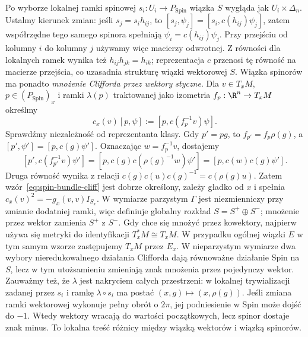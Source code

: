 Po wyborze lokalnej ramki spinowej $s_i:U_i\to P_{\mathrm{Spin}}$
wiązka $S$ wygląda jak $U_i\times\Delta_n$. Ustalmy kierunek
zmian: jeśli $s_j=s_i h_{ij}$, to
$[s_j,\psi_j]=[s_i,c(h_{ij})\psi_j]$, zatem współrzędne
tego samego spinora spełniają $\psi_i=c(h_{ij})\psi_j$.
Przy przejściu od kolumny $i$ do kolumny $j$ używamy więc
macierzy odwrotnej. Z równości dla lokalnych ramek wynika też
$h_{ij}h_{jk}=h_{ik}$; reprezentacja $c$ przenosi tę równość
na macierze przejścia, co uzasadnia strukturę wiązki wektorowej $S$.
Wiązka spinorów ma ponadto \emph{mnożenie Clifforda przez wektory
styczne}. Dla $v\in T_xM$, $p\in(P_{\mathrm{Spin}})_x$ i
ramki $\lambda(p)$ traktowanej jako izometria
$f_p:\R^n\to T_xM$ określmy
\begin{equation}\label{eq:spin-bundle-cliff}
 c_x(v)[p,\psi]
   :=[p,c(f_p^{-1}v)\psi].
\end{equation}
Sprawdźmy niezależność od reprezentanta klasy. Gdy $p'=pg$,
to $f_{p'}=f_p\rho(g)$, a $[p',\psi']=[p,c(g)\psi']$.
Oznaczając $w=f_p^{-1}v$, dostajemy
\[
 [p',c(f_{p'}^{-1}v)\psi']
 =[p,c(g)c(\rho(g)^{-1}w)\psi']
 =[p,c(w)c(g)\psi'].
\]
Druga równość wynika z relacji
$c(g)c(u)c(g)^{-1}=c(\rho(g)u)$.
Zatem wzór~\eqref{eq:spin-bundle-cliff} jest dobrze określony,
zależy gładko od $x$ i spełnia
$c_x(v)^2=-g_x(v,v)I_{S_x}$.
W wymiarze parzystym $\Gamma$ jest niezmienniczy przy zmianie
dodatniej ramki, więc definiuje globalny rozkład
$S=S^+\oplus S^-$; mnożenie przez wektor zamienia $S^+$ z $S^-$.
Gdy chce się mnożyć przez kowektory, najpierw używa się metryki
do identyfikacji $T_x^*M\cong T_xM$.
W przypadku ogólnej wiązki $E$ w tym samym wzorze zastępujemy
$T_xM$ przez $E_x$.
W nieparzystym wymiarze dwa wybory nieredukowalnego działania
Clifforda dają równoważne działanie Spin na $S$, lecz w tym
utożsamieniu zmieniają znak mnożenia przez pojedynczy wektor.
Zauważmy też, że $\lambda$ jest nakryciem całych przestrzeni:
w lokalnej trywializacji zadanej przez $s_i$ i ramkę $\lambda\circ s_i$
ma postać $(x,g)\mapsto(x,\rho(g))$.
Jeśli zmiana ramki wektorowej wykonuje pełny
obrót o $2\pi$, jej podniesienie w Spin
może dojść do $-1$. Wtedy wektory wracają
do wartości początkowych, lecz spinor dostaje
znak minus. To lokalna treść różnicy między
wiązką wektorów i wiązką spinorów.

